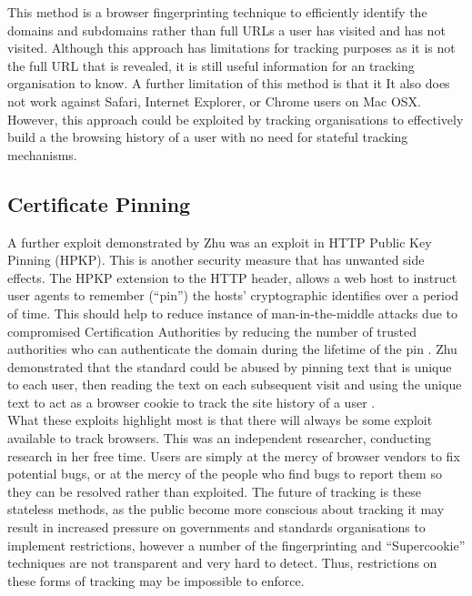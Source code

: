 \documentclass[12pt]{article}
\begin{document}
This method is a browser fingerprinting technique to efficiently identify the domains and subdomains rather than full URLs a user has visited and has not visited. Although this approach has limitations for tracking purposes as it is not the full URL that is revealed, it is still useful information for an tracking organisation to know. A further limitation of this method is that it It also does not work against Safari, Internet Explorer, or Chrome users on Mac OSX. However, this approach could be exploited by tracking organisations to effectively build a the browsing history of a user with no need for stateful tracking mechanisms. 

\subsection{Certificate Pinning}
A further exploit demonstrated by Zhu was an exploit in HTTP Public Key Pinning (HPKP). This is another security measure that has unwanted side effects. The HPKP extension to the HTTP header, allows a web host to instruct user agents to remember (``pin'') the hosts' cryptographic identifies over a period of time. This should help to reduce instance of man-in-the-middle attacks due to compromised Certification Authorities by reducing the number of trusted authorities who can authenticate the domain during the lifetime of the pin \parencite{HPKP}. Zhu demonstrated that the standard could be abused by pinning text that is unique to each user, then reading the text on each subsequent visit and using the unique text to act as a browser cookie to track the site history of a user \parencite{newTracking}. \\

What these exploits highlight most is that there will always be some exploit available to track browsers. This was an independent researcher, conducting research in her free time. Users are simply at the mercy of browser vendors to fix potential bugs, or at the mercy of the people who find bugs to report them so they can be resolved rather than exploited. The future of tracking is these stateless methods, as the public become more conscious about tracking it may result in increased pressure on governments and standards organisations to implement restrictions, however a number of the fingerprinting and ``Supercookie'' techniques are not transparent and very hard to detect. Thus, restrictions on these forms of tracking may be impossible to enforce. 
\end{document}
